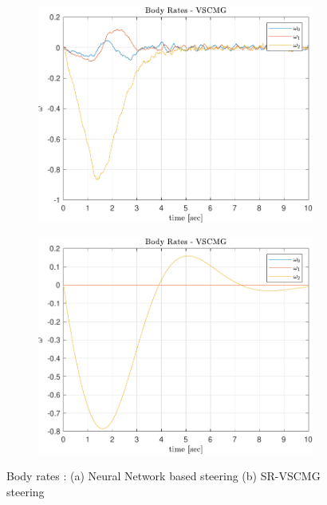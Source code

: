 \begin{figure}[ht]
     \centering
     \begin{subfigure}[b]{0.49\textwidth}
         \centering
         \includegraphics[width=\textwidth]{figures/plots/Results/vs-nn-w.pdf}
         \label{fig:nn_w}
     \end{subfigure}
     \begin{subfigure}[b]{0.49\textwidth}
         \centering
         \includegraphics[width=\textwidth]{figures/plots/Results/vs-vs-w.pdf}
         \label{fig:vs_w}
     \end{subfigure}
        \caption{Body rates : (a) Neural Network based steering (b) SR-VSCMG steering}
        \label{fig:nnvscmg_w}
\end{figure}

